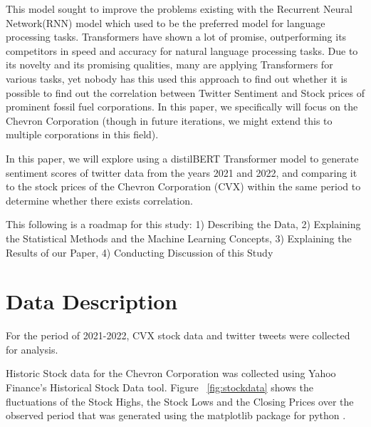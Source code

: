 \documentclass[12pt, letterpaper, titlepage]{article}
\begin{document}
This model sought to improve the problems existing with the Recurrent Neural Network(RNN) model which used to be the preferred model for language processing tasks. Transformers have shown a lot of promise, outperforming its competitors in speed and accuracy for natural language processing tasks. Due to its novelty and its promising qualities, many are applying Transformers for various tasks, yet nobody has this used this approach to find out whether it is possible to find out the correlation between Twitter Sentiment and Stock prices of prominent fossil fuel corporations. In this paper, we specifically will focus on the Chevron Corporation (though in future iterations, we might extend this to multiple corporations in this field).

In this paper, we will explore using a distilBERT Transformer model to generate sentiment scores of twitter data from the years 2021 and 2022, and comparing it to the stock prices of the Chevron Corporation (CVX) within the same period to determine whether there exists correlation. 

This following is a roadmap for this study: 1) Describing the Data, 2) Explaining the Statistical Methods and the Machine Learning Concepts, 3) Explaining the Results of our Paper, 4) Conducting Discussion of this Study

\label{sec: datadesc}
\section{Data Description}

For the period of 2021-2022,  CVX stock data and twitter tweets were collected for analysis.

Historic Stock data for the Chevron Corporation was collected using Yahoo Finance's Historical Stock Data tool. Figure ~\ref{fig:stockdata} shows the fluctuations of the Stock Highs, the Stock Lows and the Closing Prices over the observed period that was generated using the matplotlib package for python \citep{Hunter_2007}. 
\end{document}
